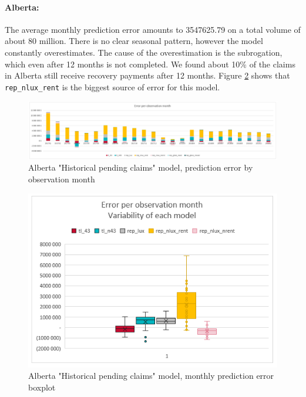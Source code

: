 	\paragraph{Alberta:}
		The average monthly prediction error amounts to 3547625.79 on a total volume of about 80 million. There is no clear seasonal pattern, however the model constantly overestimates. The cause of the overestimation is the subrogation, which even after 12 months is not completed. We found about 10\% of the claims in Alberta still receive recovery payments after 12 months. Figure \ref{Fig_AB_current_er_boxplot} shows that \texttt{rep\_nlux\_rent} is the biggest source of error for this model.   
		\begin{figure}[H]
			\begin{center}
				\includegraphics[scale=0.4]{Graphiques/AB_current_model_by_month} 
				\renewcommand{\figurename}{Figure}
				\caption{Alberta "Historical  pending claims" model, prediction error by observation month}\label{Fig_AB_current_er_by_month}
			\end{center}
		\end{figure}
		\begin{figure}[H]
			\begin{center}
				\includegraphics[scale=0.4]{Graphiques/AB_current_model_mustach} 
				\renewcommand{\figurename}{Figure}
				\caption{Alberta "Historical  pending claims" model, monthly prediction error boxplot}\label{Fig_AB_current_er_boxplot}
			\end{center}
		\end{figure}
	
